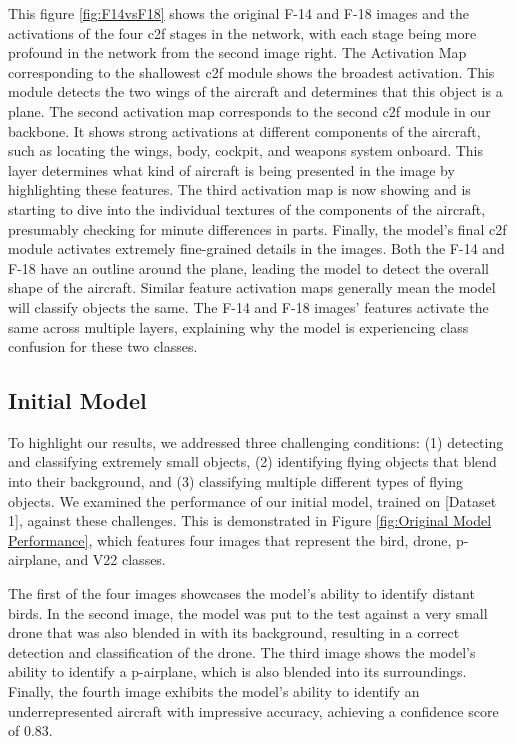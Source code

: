\documentclass[10pt,twocolumn,letterpaper]{article}
\begin{document}
This figure \ref{fig:F14vsF18} shows the original F-14 and F-18 images and the activations of the four c2f stages in the network, with each stage being more profound in the network from the second image right. The Activation Map corresponding to the shallowest c2f module shows the broadest activation. This module detects the two wings of the aircraft and determines that this object is a plane. The second activation map corresponds to the second c2f module in our backbone. It shows strong activations at different components of the aircraft, such as locating the wings, body, cockpit, and weapons system onboard. This layer determines what kind of aircraft is being presented in the image by highlighting these features. The third activation map is now showing and is starting to dive into the individual textures of the components of the aircraft, presumably checking for minute differences in parts. Finally, the model's final c2f module activates extremely fine-grained details in the images. Both the F-14 and F-18 have an outline around the plane, leading the model to detect the overall shape of the aircraft. Similar feature activation maps generally mean the model will classify objects the same. The F-14 and F-18 images' features activate the same across multiple layers, explaining why the model is experiencing class confusion for these two classes.

\subsection{Initial Model}

To highlight our results, we addressed three challenging conditions: (1) detecting and classifying extremely small objects, (2) identifying flying objects that blend into their background, and (3) classifying multiple different types of flying objects. We examined the performance of our initial model, trained on [Dataset 1], against these challenges. This is demonstrated in Figure \ref{fig:Original Model Performance}, which features four images that represent the bird, drone, p-airplane, and V22 classes.

The first of the four images showcases the model's ability to identify distant birds. In the second image, the model was put to the test against a very small drone that was also blended in with its background, resulting in a correct detection and classification of the drone. The third image shows the model's ability to identify a p-airplane, which is also blended into its surroundings. Finally, the fourth image exhibits the model's ability to identify an underrepresented aircraft with impressive accuracy, achieving a confidence score of 0.83.
\end{document}
